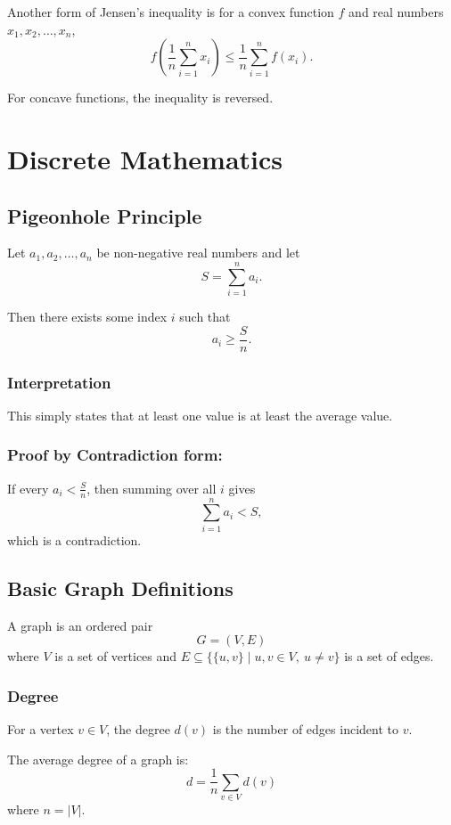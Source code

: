 \documentclass[11pt,openany]{book}
\begin{document}
Another form of Jensen’s inequality is for a convex function \(f\) and real numbers \(x_1, x_2, \dots, x_n\), 
\[
f(\frac{1}{n}\sum_{i=1}^n x_i) \le \frac{1}{n}\sum_{i=1}^n f(x_i).
\]

For concave functions, the inequality is reversed.

\chapter{Discrete Mathematics}

\section{Pigeonhole Principle}
\label{pigeonhole_principle}

Let \(a_1,a_2,\dots,a_n\) be non-negative real numbers and let
\[
S=\sum_{i=1}^{n}a_i.
\]

Then there exists some index \(i\) such that
\[
a_i \ge \frac{S}{n}.
\]

\subsection*{Interpretation}

This simply states that at least one value is at least the average value.

\subsection*{Proof by Contradiction form:}

If every \(a_i < \frac{S}{n}\), then summing over all \(i\) gives
\[
\sum_{i=1}^{n} a_i < S,
\]
which is a contradiction.

\section{Basic Graph Definitions}

A graph is an ordered pair
\[
G=(V,E)
\]
where \(V\) is a set of vertices and \(E\subseteq \{\{u,v\}\mid u,v\in V,\ u\neq v\}\) is a set of edges.

\subsection*{Degree}

For a vertex \(v\in V\), the degree \(d(v)\) is the number of edges incident to \(v\).

The average degree of a graph is:
\[
d=\frac{1}{n}\sum_{v\in V} d(v)
\]
where \(n=|V|\).
\end{document}
